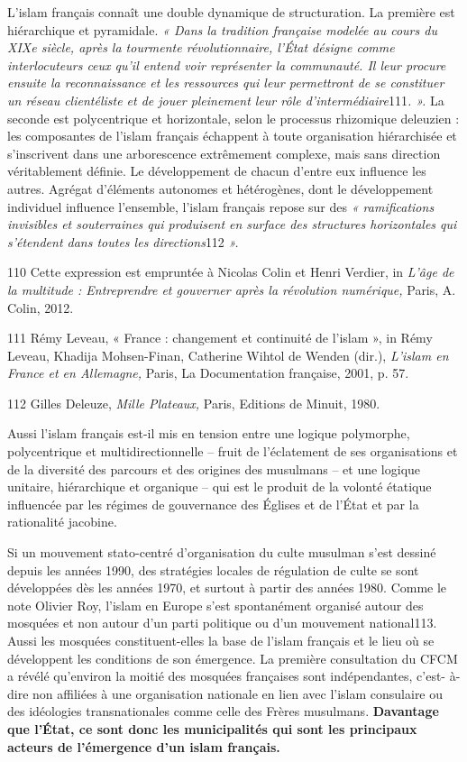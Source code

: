 L'islam français connaît une double dynamique de structuration. La
première est hiérarchique et pyramidale. \emph{« Dans la tradition
française modelée au cours du XIXe siècle, après la tourmente
révolutionnaire, l'État désigne comme interlocuteurs ceux qu'il entend
voir représenter la communauté. Il leur procure ensuite la
reconnaissance et les ressources qui leur permettront de se constituer
un réseau clientéliste et de jouer pleinement leur rôle
d'intermédiaire}111\emph{. ».} La seconde est polycentrique et
horizontale, selon le processus rhizomique deleuzien : les composantes
de l'islam français échappent à toute organisation hiérarchisée et
s'inscrivent dans une arborescence extrêmement complexe, mais sans
direction véritablement définie. Le développement de chacun d'entre eux
influence les autres. Agrégat d'éléments autonomes et hétérogènes, dont
le développement individuel influence l'ensemble, l'islam français
repose sur des \emph{« ramifications invisibles et souterraines qui
produisent en surface des structures horizontales qui s'étendent dans
toutes les directions}112 \emph{».}

110 Cette expression est empruntée à Nicolas Colin et Henri Verdier, in
\emph{L'âge de la multitude : Entreprendre et gouverner après la
révolution numérique,} Paris, A. Colin, 2012.

111 Rémy Leveau, « France : changement et continuité de l'islam », in
Rémy Leveau, Khadija Mohsen-Finan, Catherine Wihtol de Wenden (dir.),
\emph{L'islam en France et en Allemagne,} Paris, La Documentation
française, 2001, p. 57.

112 Gilles Deleuze, \emph{Mille Plateaux,} Paris, Editions de Minuit,
1980.



Aussi l'islam français est-il mis en tension entre une logique
polymorphe, polycentrique et multidirectionnelle -- fruit de
l'éclatement de ses organisations et de la diversité des parcours et des
origines des musulmans -- et une logique unitaire, hiérarchique et
organique -- qui est le produit de la volonté étatique influencée par
les régimes de gouvernance des Églises et de l'État et par la
rationalité jacobine.

Si un mouvement stato-centré d'organisation du culte musulman s'est
dessiné depuis les années 1990, des stratégies locales de régulation de
culte se sont développées dès les années 1970, et surtout à partir des
années 1980. Comme le note Olivier Roy, l'islam en Europe s'est
spontanément organisé autour des mosquées et non autour d'un parti
politique ou d'un mouvement national113. Aussi les mosquées
constituent-elles la base de l'islam français et le lieu où se
développent les conditions de son émergence. La première consultation du
CFCM a révélé qu'environ la moitié des mosquées françaises sont
indépendantes, c'est- à-dire non affiliées à une organisation nationale
en lien avec l'islam consulaire ou des idéologies transnationales comme
celle des Frères musulmans. \textbf{Davantage que l'État, ce sont donc
les municipalités qui sont les principaux acteurs de l'émergence d'un
islam français.}


